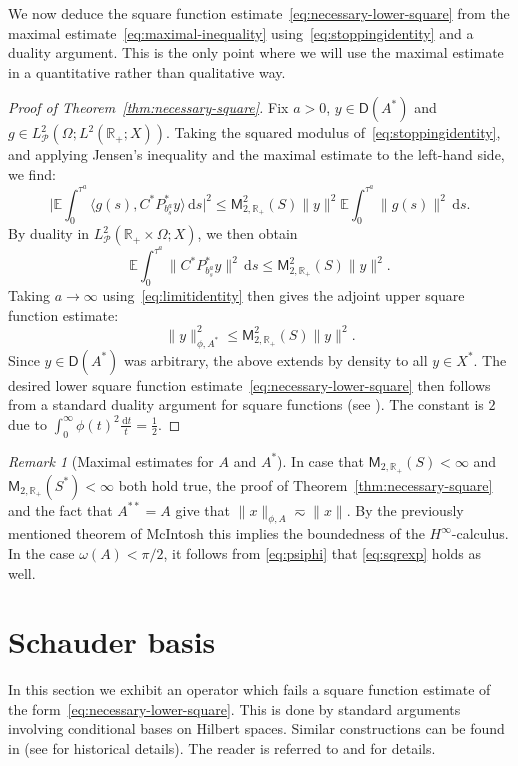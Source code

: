 \documentclass[11pt]{amsart}
\theoremstyle{definition}
\theoremstyle{remark}
\newtheorem{remark}[theorem]{Remark}
\numberwithin{equation}{section}
\newcommand{\E}{\mathbb E}
\newcommand{\cP}{\mathcal P}
\newcommand{\R}{\mathbb R}
\newcommand{\1}{\mathbf 1}
\newcommand{\cM}{\mathsf{M}}
\newcommand{\cD}{\mathsf D}
\newcommand{\norm}[1]{\lVert #1\rVert}
\newcommand{\abs}[1]{\lvert #1\rvert}
\newcommand{\dd}{\,\mathrm d}
\begin{document}
We now deduce the square function estimate~\eqref{eq:necessary-lower-square} from the maximal estimate~\eqref{eq:maximal-inequality} using~\eqref{eq:stoppingidentity} and a duality argument.
This is the only point where we will use the maximal estimate in a quantitative rather than qualitative way.
\begin{proof}[Proof of Theorem~\ref{thm:necessary-square}]
    Fix $a > 0$, $y \in \cD(A^*)$ and $g \in L^2_{\cP}(\Omega;L^2(\R_+;X))$.
    Taking the squared modulus of~\eqref{eq:stoppingidentity}, and applying Jensen's inequality and the maximal estimate to the left-hand side, we find:
    \begin{equation*}
        \abs{\E \int_0^{\tau^a} \langle g(s),  C^* P_{b^a_s}^*y \rangle \dd s}^2 \leq \cM_{2,\R_+}^2(S) \norm{y}^2 \E \int_0^{\tau^a} \norm{g(s)}^2 \dd s.
    \end{equation*}
    By duality in $L^2_{\cP}(\R_+ \times \Omega;X)$, we then obtain
    \begin{equation*}
        \E \int_0^{\tau^a} \norm{C^* P_{b^a_s}^* y}^2 \dd s \leq \cM_{2,\R_+}^2(S) \norm{y}^2.
    \end{equation*}
    Taking $a \to \infty$ using~\eqref{eq:limitidentity} then gives the adjoint upper square function estimate:
    \begin{equation*}
        \norm{y}_{\phi,A^*}^2 \leq \cM_{2,\R_+}^2(S) \norm{y}^2.
    \end{equation*}
    Since $y \in \cD(A^*)$ was arbitrary, the above extends by density to all $y \in X^*$.
    The desired lower square function estimate~\eqref{eq:necessary-lower-square} then follows from a standard duality argument for square functions (see \cite[p. 196]{Haase2006}). The constant is $2$ due to $\int_0^\infty \phi(t)^2 \frac{\dd t}{t} =\frac12$. 
\end{proof}


\begin{remark}[Maximal estimates for \(A\) and \(A^*\)]
\label{rem:maximal-both-Hinfty}
In case that $\cM_{2,\R_+}(S) < \infty$ and $\cM_{2,\R_+}(S^*) < \infty$ both hold true, the proof of Theorem~\ref{thm:necessary-square} and the fact that $A^{**} = A$ give that $\norm{x}_{\phi,A} \eqsim \|x\|$. By the previously mentioned theorem of McIntosh this implies the boundedness of the $H^\infty$-calculus. In the case $\omega(A)<\pi/2$, it follows from \eqref{eq:psiphi} that \eqref{eq:sqrexp} holds as well. 
\end{remark}

\section{Schauder basis}
\label{sec:schauder}
In this section we exhibit an operator which fails a square function estimate of the form~\eqref{eq:necessary-lower-square}.
This is done by standard arguments involving conditional bases on Hilbert spaces. Similar constructions can be found in \cite{BaillonClement1991} (see \cite{Fackler2015,Haase2006,HNVW2017} for historical details).
The reader is referred to \cite[Definition 1.1.1]{AlbiacKalton-Book} and \cite{Singer1970} for details.
\end{document}
